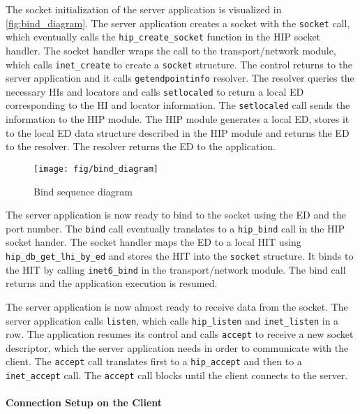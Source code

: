 The socket initialization of the server application is visualized in
\autoref{fig:bind_diagram}. The server application creates a socket
with the \verb|socket| call, which eventually calls the
\verb|hip_create_socket| function in the HIP socket handler. The
socket handler wraps the call to the transport/network module, which
calls \verb|inet_create| to create a \verb|socket| structure. The
control returns to the server application and it calls
\verb|getendpointinfo| resolver. The resolver queries the necessary
HIs and locators and calls \verb|setlocaled| to return a local ED
corresponding to the HI and locator information. The \verb|setlocaled|
call sends the information to the HIP module. The HIP module generates
a local ED, stores it to the local ED data structure described in the
HIP module and returns the ED to the resolver. The resolver returns
the ED to the application.

\begin{figure}[htb]
\begin{center}
\texttt{[image: fig/bind\_diagram]}
\end{center}
\caption{Bind sequence diagram}
\label{fig:bind_diagram}
\end{figure}

The server application is now ready to bind to the socket using the ED
and the port number. The \verb|bind| call eventually translates to a
\verb|hip_bind| call in the HIP socket hander. The socket handler maps
the ED to a local HIT using \verb|hip_db_get_lhi_by_ed| and stores the
HIT into the \verb|socket| structure. It binds to the HIT by calling
\verb|inet6_bind| in the transport/network module. The bind call
returns and the application execution is resumed.

The server application is now almost ready to receive data from the
socket. The server application calls \verb|listen|, which calls
\verb|hip_listen| and \verb|inet_listen| in a row. The application
resumes its control and calls \verb|accept| to receive a new socket
descriptor, which the server application needs in order to communicate
with the client. The \verb|accept| call translates first to a
\verb|hip_accept| and then to a \verb|inet_accept| call. The 
\verb|accept| call blocks until the client connects to the server.

\paragraph{Connection Setup on the Client}

